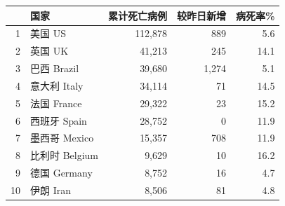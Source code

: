 \documentclass[
]{article}
\begin{document}
\begin{table}[H]
\begin{minipage}{.6\linewidth}
\begin{table}[H]
\begin{tabular}{rlrrr}
\toprule
  & 国家 & 累计死亡病例 & 较昨日新增 & 病死率\%\\
\midrule
\rowcolor{gray!6}  1 & 美国 US & 112,878 & 889 & 5.6\\
2 & 英国 UK & 41,213 & 245 & 14.1\\
\rowcolor{gray!6}  3 & 巴西 Brazil & 39,680 & 1,274 & 5.1\\
4 & 意大利 Italy & 34,114 & 71 & 14.5\\
\rowcolor{gray!6}  5 & 法国 France & 29,322 & 23 & 15.2\\
6 & 西班牙 Spain & 28,752 & 0 & 11.9\\
\rowcolor{gray!6}  7 & 墨西哥 Mexico & 15,357 & 708 & 11.9\\
8 & 比利时 Belgium & 9,629 & 10 & 16.2\\
\rowcolor{gray!6}  9 & 德国 Germany & 8,752 & 16 & 4.7\\
10 & 伊朗 Iran & 8,506 & 81 & 4.8\\
\bottomrule
\end{tabular}
\endgroup{}
\end{table} \end{minipage} 
\end{table}
\end{document}
